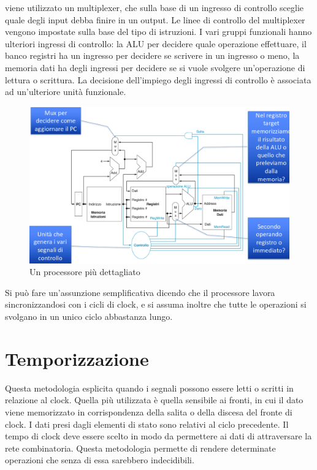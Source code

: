 viene utilizzato un multiplexer, che sulla base di un ingresso di controllo sceglie quale degli input debba finire in un output. Le linee di controllo del multiplexer 
vengono impostate sulla base del tipo di istruzioni. I vari gruppi funzionali hanno ulteriori ingressi di controllo: la ALU per decidere quale operazione effettuare, il
banco registri ha un ingresso per decidere se scrivere in un ingresso o meno, la memoria dati ha degli ingressi per decidere se si vuole svolgere un'operazione di lettura
o scrittura. La decisione dell'impiego degli ingressi di controllo \`e associata ad un'ulteriore unit\`a funzionale.
\begin{figure}
  \includegraphics[scale=0.2]{Pictures/CPUDettagliata.png}
  \caption{Un processore pi\`u dettagliato}
  \label{fig:boat1}
\end{figure}
\newpage
Si pu\`o fare un'assunzione semplificativa dicendo che il processore lavora sincronizzandosi con i cicli di clock, e si assuma inoltre che tutte le operazioni si svolgano
in un unico ciclo abbastanza lungo. 
\section{Temporizzazione}
Questa metodologia esplicita quando i segnali possono essere letti o scritti in relazione al clock. Quella pi\`u utilizzata \`e quella sensibile ai fronti, in cui il dato 
viene memorizzato in corrispondenza della salita o della discesa del fronte di clock. I dati presi dagli elementi di stato sono relativi al ciclo precedente. Il tempo 
di clock deve essere scelto in modo da permettere ai dati di attraversare la rete combinatoria. Questa metodologia permette di rendere determinate operazioni che senza
di essa sarebbero indecidibili. 
